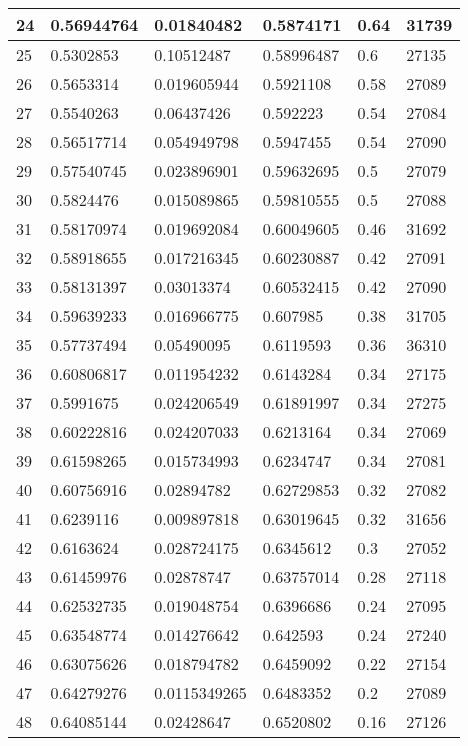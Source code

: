 \begin{longtable}{|l|l|l|l|l|l|}
24 & 0.56944764 & 0.01840482 & 0.5874171 & 0.64 & 31739 \\ \hline 
25 & 0.5302853 & 0.10512487 & 0.58996487 & 0.6 & 27135 \\ \hline 
26 & 0.5653314 & 0.019605944 & 0.5921108 & 0.58 & 27089 \\ \hline 
27 & 0.5540263 & 0.06437426 & 0.592223 & 0.54 & 27084 \\ \hline 
28 & 0.56517714 & 0.054949798 & 0.5947455 & 0.54 & 27090 \\ \hline 
29 & 0.57540745 & 0.023896901 & 0.59632695 & 0.5 & 27079 \\ \hline 
30 & 0.5824476 & 0.015089865 & 0.59810555 & 0.5 & 27088 \\ \hline 
31 & 0.58170974 & 0.019692084 & 0.60049605 & 0.46 & 31692 \\ \hline 
32 & 0.58918655 & 0.017216345 & 0.60230887 & 0.42 & 27091 \\ \hline 
33 & 0.58131397 & 0.03013374 & 0.60532415 & 0.42 & 27090 \\ \hline 
34 & 0.59639233 & 0.016966775 & 0.607985 & 0.38 & 31705 \\ \hline 
35 & 0.57737494 & 0.05490095 & 0.6119593 & 0.36 & 36310 \\ \hline 
36 & 0.60806817 & 0.011954232 & 0.6143284 & 0.34 & 27175 \\ \hline 
37 & 0.5991675 & 0.024206549 & 0.61891997 & 0.34 & 27275 \\ \hline 
38 & 0.60222816 & 0.024207033 & 0.6213164 & 0.34 & 27069 \\ \hline 
39 & 0.61598265 & 0.015734993 & 0.6234747 & 0.34 & 27081 \\ \hline 
40 & 0.60756916 & 0.02894782 & 0.62729853 & 0.32 & 27082 \\ \hline 
41 & 0.6239116 & 0.009897818 & 0.63019645 & 0.32 & 31656 \\ \hline 
42 & 0.6163624 & 0.028724175 & 0.6345612 & 0.3 & 27052 \\ \hline 
43 & 0.61459976 & 0.02878747 & 0.63757014 & 0.28 & 27118 \\ \hline 
44 & 0.62532735 & 0.019048754 & 0.6396686 & 0.24 & 27095 \\ \hline 
45 & 0.63548774 & 0.014276642 & 0.642593 & 0.24 & 27240 \\ \hline 
46 & 0.63075626 & 0.018794782 & 0.6459092 & 0.22 & 27154 \\ \hline 
47 & 0.64279276 & 0.0115349265 & 0.6483352 & 0.2 & 27089 \\ \hline 
48 & 0.64085144 & 0.02428647 & 0.6520802 & 0.16 & 27126 \\ \hline 

\end{longtable}
